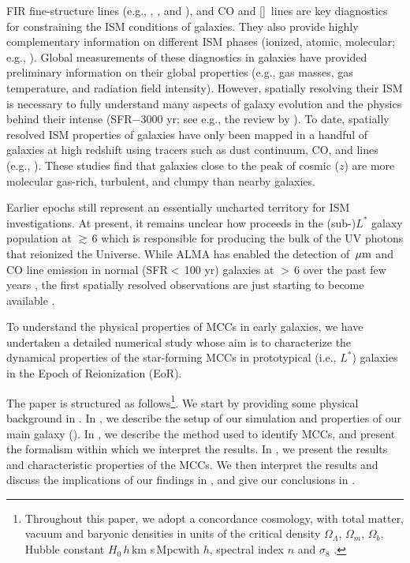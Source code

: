 \IfFileExists{emulateapjlegacy.cls}{\documentclass[iop]{emulateapjlegacy}}{\documentclass[iop]{emulateapj}}
\begin{document}
FIR fine-structure lines (e.g., \cii, \nii, and \oiii), and CO and [\ci]~lines are key diagnostics for constraining the ISM conditions of galaxies. They also provide highly complementary information on different ISM phases (ionized, atomic, molecular; e.g., \citealt{Scoville74a, Rubin85a, Malhotra01a}).
%
Global measurements of these diagnostics in \highz galaxies have provided preliminary information on their global properties (e.g., gas masses, gas temperature, and radiation field intensity). However, spatially resolving their ISM is necessary to fully understand many aspects of galaxy evolution and the physics behind their intense \SF (SFR$-$3000\,\Msun\,yr\pmOne; 
see e.g., the review by \citealt{CW13}).
%
To date, spatially resolved ISM properties of \highz galaxies have only been mapped in a handful of 
galaxies at high redshift using tracers such as dust continuum, CO, and \cii lines (e.g., \citealt{Swinbank11a, Hodge15a, Ferkinhoff15a, 
Hodge16a, Leung19a}). These studies find that galaxies close to the peak of cosmic \SF ($z$) are more molecular gas-rich, turbulent, and clumpy than nearby galaxies.

Earlier epochs still represent an essentially uncharted territory for ISM investigations. At present, it remains unclear how \SF proceeds in the (sub-)$L^*$ galaxy population at \z$\gtrsim$\,6  which is responsible for producing the bulk of the UV photons that reionized the Universe.
%
While ALMA has enabled the detection of \,$\mbox{$\mu$m}$ and CO line emission in normal (SFR$<$\,100\,\Msun\,yr\pmOne) galaxies at \z$>$\,6 over the past few years \citep[e.g.,][]{Carniani18b, Odorico18a}, the first spatially resolved observations are just starting to become available \citep[e.g., ][]{Jones17a}.

To understand the physical properties of MCCs in early galaxies,
we have undertaken a detailed numerical study whose aim is to characterize the dynamical properties of the star-forming %
MCCs
in prototypical (i.e., $L^*$) galaxies in the Epoch of Reionization (EoR).

The paper is structured as follows\footnote{Throughout this paper, we adopt a concordance cosmology, with total matter, vacuum and baryonic densities in units of the critical density $\Omega_{\Lambda}$, $\Omega_m$, $\Omega_b$, Hubble constant $H_0$\,$h$\,km s\pmOne\,Mpc\pmOne with $h$, spectral index $n$ and $\sigma_8$ \citep{Planck14a}.}. We start by providing some physical background in . In , we describe the setup of our simulation and properties of our main galaxy (\flower). In , we describe the method used to identify
MCCs,
and present the formalism within which we interpret the results. In , we present the results and characteristic properties of the MCCs. We then interpret the results and discuss the implications of our findings in , and give our conclusions in .
%
\end{document}
